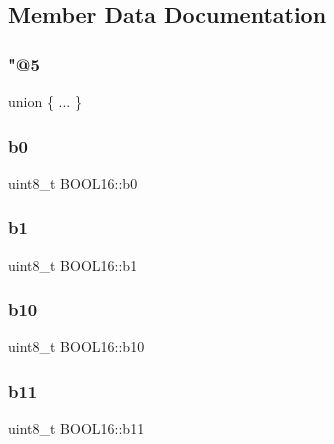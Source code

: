 \subsection{Member Data Documentation}
\hypertarget{struct_b_o_o_l16_acc56c021b41931443a7097050511bea1}{}\label{struct_b_o_o_l16_acc56c021b41931443a7097050511bea1} 
\subsubsection{\texorpdfstring{"@5}{@5}}
{\footnotesize\ttfamily union \{ ... \} }

\hypertarget{struct_b_o_o_l16_a1c75989c92ef896a7056bf995446e8ed}{}\label{struct_b_o_o_l16_a1c75989c92ef896a7056bf995446e8ed} 
\subsubsection{\texorpdfstring{b0}{b0}}
{\footnotesize\ttfamily uint8\+\_\+t B\+O\+O\+L16\+::b0}

\hypertarget{struct_b_o_o_l16_a630e67515ea8cf94ccae883690e7a47e}{}\label{struct_b_o_o_l16_a630e67515ea8cf94ccae883690e7a47e} 
\subsubsection{\texorpdfstring{b1}{b1}}
{\footnotesize\ttfamily uint8\+\_\+t B\+O\+O\+L16\+::b1}

\hypertarget{struct_b_o_o_l16_ac44f4602dac15b4761e88c72c70e9269}{}\label{struct_b_o_o_l16_ac44f4602dac15b4761e88c72c70e9269} 
\subsubsection{\texorpdfstring{b10}{b10}}
{\footnotesize\ttfamily uint8\+\_\+t B\+O\+O\+L16\+::b10}

\hypertarget{struct_b_o_o_l16_adb855b1e1ff298e3134feb8cbbe4c02e}{}\label{struct_b_o_o_l16_adb855b1e1ff298e3134feb8cbbe4c02e} 
\subsubsection{\texorpdfstring{b11}{b11}}
{\footnotesize\ttfamily uint8\+\_\+t B\+O\+O\+L16\+::b11}

